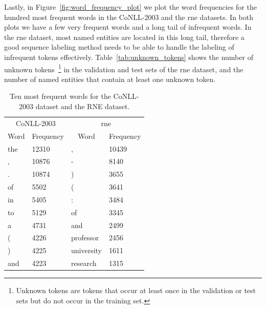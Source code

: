 \documentclass{nle}
\begin{document}
Lastly, in Figure~\ref{fig:word_frequency_plot}
we plot the word frequencies for the hundred most frequent words in the {CoNLL-2003} and 
the \gls{rne} datasets. In both plots we have a few very frequent words and a long tail of
infrequent words. In the \gls{rne} dataset, most named entities are located in this long tail, 
therefore a good sequence labeling method needs to be able to handle the labeling of infrequent 
tokens effectively. 
Table~\ref{tab:unknown_tokens} shows the number of unknown tokens~\footnote{
Unknown tokens are tokens that occur at least once in the validation or test sets 
but do not occur in the training set.
}
in the validation and test
sets of the \gls{rne} dataset, and the number of named entities that contain at least one 
unknown token. 

\begin{table}[h]
  \small
  \begin{center}
    \begin{tabular}{ llll }
      \toprule
      \multicolumn{2}{c}{CoNLL-2003} & \multicolumn{2}{c}{\gls{rne}} \\
      \multicolumn{1}{c}{Word} & \multicolumn{1}{c}{Frequency} &
      \multicolumn{1}{c}{Word} & \multicolumn{1}{c}{Frequency} \\
      \midrule
      the & 12310 & , & 10439      \\
      , & 10876 & - & 8140         \\
      . & 10874 & ) & 3655         \\
      of & 5502 & ( & 3641         \\
      in & 5405 & : & 3484         \\
      to & 5129 & of & 3345        \\
      a & 4731 & and & 2499        \\
      ( & 4226 & professor & 2456  \\
      ) & 4225 & university & 1611 \\
      and & 4223 & research & 1315 \\
      \bottomrule
    \end{tabular}
  \end{center}
  \caption{Ten most frequent words for the {CoNLL-2003} dataset and the RNE dataset.}
  \label{tab:frequent_words}
\end{table}
\end{document}
